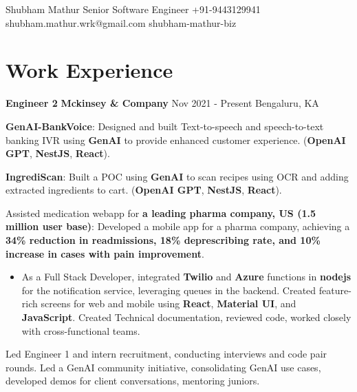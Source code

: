 \documentclass[letterpaper]{resume_config}
\begin{document}
\Header
    {Shubham Mathur} %
    {Senior Software Engineer}
    {+91-9443129941} %
    {shubham.mathur.wrk@gmail.com} %
    {shubham-mathur-biz} %

\section{\textcolor{NavyBlue}{Work Experience}}

\WorkExperience
    {\textbf{Engineer 2}} %
    {\textbf{Mckinsey \& Company}} %
    {Nov 2021 - Present} %
    {Bengaluru, KA} %
    {
    \item{\textbf{GenAI-BankVoice}: Designed and built Text-to-speech and speech-to-text banking IVR using \textbf{GenAI} to provide enhanced customer experience. (\textbf{OpenAI GPT}, \textbf{NestJS}, \textbf{React}).}
    \item{\textbf{IngrediScan}: Built a POC using \textbf{GenAI} to scan recipes using OCR and adding extracted ingredients to cart. (\textbf{OpenAI GPT}, \textbf{NestJS}, \textbf{React}).}
    \item{Assisted medication webapp for \textbf{a leading pharma company, US (1.5 million user base)}: Developed a mobile app for a pharma company, achieving a \textbf{34\% reduction in readmissions, 18\% deprescribing rate, and 10\% increase in cases with pain improvement}.}
    
    \begin{itemize}
        \item{As a Full Stack Developer, integrated \textbf{Twilio} and \textbf{Azure} functions in \textbf{nodejs} for the notification service, leveraging queues in the backend. Created feature-rich screens for web and mobile using \textbf{React}, \textbf{Material UI}, and \textbf{JavaScript}. Created Technical documentation, reviewed code, worked closely with cross-functional teams.}

    \end{itemize}
        \item Led Engineer 1 and intern recruitment, conducting interviews and code pair rounds. Led a GenAI community initiative, consolidating GenAI use cases, developed demos for client conversations, mentoring juniors.
    } 
\end{document}
